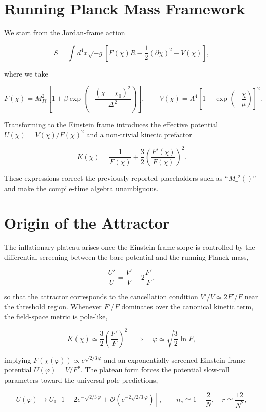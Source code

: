 \documentclass[
]{article}
\begin{document}
\section{Running Planck Mass
Framework}\label{running-planck-mass-framework}

We start from the Jordan-frame action

\[
S = \int d^{4}x\sqrt{- g}\left\lbrack F(\chi)R - \frac{1}{2}(\partial\chi)^{2} - V(\chi) \right\rbrack,
\]

where we take

\[
F(\chi) = M_{Pl}^{2}\left\lbrack 1 + \beta\exp\left( - \frac{(\chi - \chi_{0})^{2}}{\Delta^{2}} \right) \right\rbrack,\quad\quad V(\chi) = \Lambda^{4}\left\lbrack 1 - \exp\left( - \frac{\chi}{\mu} \right) \right\rbrack^{2}.
\]

Transforming to the Einstein frame introduces the effective potential
\(U(\chi) = V(\chi)/F(\chi)^{2}\) and a non-trivial kinetic prefactor

\[
K(\chi) = \frac{1}{F(\chi)} + \frac{3}{2}\left( \frac{F'(\chi)}{F(\chi)} \right)^{2}.
\]

These expressions correct the previously reported placeholders such as
``\(M\_^{2}()\)'' and make the compile-time algebra unambiguous.

\section{Origin of the Attractor}\label{origin-of-the-attractor}

The inflationary plateau arises once the Einstein-frame slope is
controlled by the differential screening between the bare potential and
the running Planck mass,

\[
\frac{U'}{U} = \frac{V'}{V} - 2\frac{F'}{F},
\]

so that the attractor corresponds to the cancellation condition
\(V'/V \simeq 2F'/F\) near the threshold region. Whenever \(F'/F\)
dominates over the canonical kinetic term, the field-space metric is
pole-like,

\[
K(\chi) \simeq \frac{3}{2}\left( \frac{F'}{F} \right)^{2}\quad \Rightarrow \quad\varphi \simeq \sqrt{\frac{3}{2}}\ln F,
\]

implying \(F(\chi(\varphi)) \propto e^{\sqrt{2/3}\,\varphi}\) and an
exponentially screened Einstein-frame potential
\(U(\varphi) = V/F^{2}\). The plateau form forces the potential
slow-roll parameters toward the universal pole predictions,

\[
U(\varphi) \rightarrow U_{0}\left\lbrack 1 - 2e^{- \sqrt{2/3}\,\varphi} + \mathcal{O}(e^{- 2\sqrt{2/3}\,\varphi}) \right\rbrack,\quad\quad n_{s} \simeq 1 - \frac{2}{N},\quad r \simeq \frac{12}{N^{2}},
\]
\end{document}
